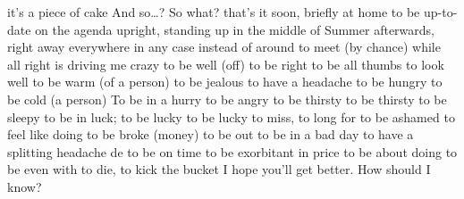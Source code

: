 {it’s a piece of cake}
{And so…?}
{So what?}
{that’s it}
{soon, briefly}
{at home}
{to be up-to-date}
{on the agenda}
{upright, standing up}
{in the middle of Summer}
{afterwards, right away}
{everywhere}
{in any case}
{instead of}
{around}
{to meet (by chance)}
{while}
{all right}
{is driving me crazy}
{to be well (off)}
{to be right}
{to be all thumbs}
{to look well}
{to be warm (of a person)}
{to be jealous}
{to have a headache}
{to be hungry}
{to be cold (a person)}
{To be in a hurry}
{to be angry}
{to be thirsty}
{to be thirsty}
{to be sleepy}
{to be in luck; to be lucky}
{to be lucky}
{to miss, to long for}
{to be ashamed}
{to feel like doing}
{to be broke (money)}
{to be out}
{to be in a bad day}
{to have a splitting headache}
{de to be on time}
{to be exorbitant in price}
{to be about doing}
{to be even with}
{to die, to kick the bucket}
{I hope you’ll get better.}
{How should I know?}

